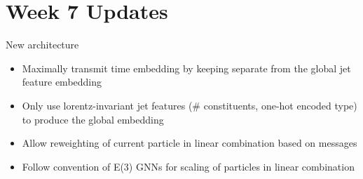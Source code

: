 \documentclass[handout, aspectratio=169,xcolor=dvipsnames]{beamer}
\begin{document}
\section{Week 7 Updates}

\begin{frame}{New architecture}
    \begin{itemize}
        \item Maximally transmit time embedding by keeping separate from the global jet feature embedding
        \item Only use lorentz-invariant jet features (\# constituents, one-hot encoded type) to produce the global embedding
        \item Allow reweighting of current particle in linear combination based on messages
        \item Follow convention of E(3) GNNs \parencite{satorrasEquivariantGraphNeural2022a} for scaling of particles in linear combination 
    \end{itemize}
\end{frame}
\end{document}
